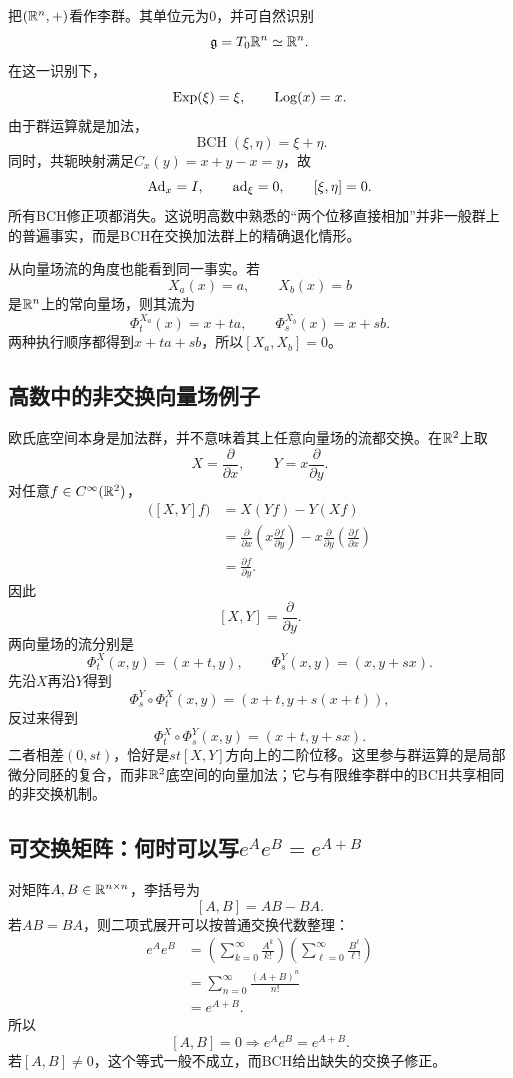 把$(\mathbb{R}^n,+)$看作李群。其单位元为$0$，并可自然识别
\[
    \mathfrak g=T_0\mathbb{R}^n\simeq\mathbb{R}^n.
\]
在这一识别下，
\[
    \operatorname{Exp}(\xi)=\xi,
    \qquad
    \operatorname{Log}(x)=x.
\]
由于群运算就是加法，
\[
    \boxed{
    \operatorname{BCH}(\xi,\eta)
    =\xi+\eta.
    }
\]
同时，共轭映射满足$C_x(y)=x+y-x=y$，故
\[
    \operatorname{Ad}_x=I,
    \qquad
    \operatorname{ad}_\xi=0,
    \qquad
    [\xi,\eta]=0.
\]
所有BCH修正项都消失。这说明高数中熟悉的“两个位移直接相加”并非一般群上的普遍事实，而是BCH在交换加法群上的精确退化情形。

从向量场流的角度也能看到同一事实。若
\[
    X_a(x)=a,
    \qquad
    X_b(x)=b
\]
是$\mathbb{R}^n$上的常向量场，则其流为
\[
    \Phi_t^{X_a}(x)=x+ta,
    \qquad
    \Phi_s^{X_b}(x)=x+sb.
\]
两种执行顺序都得到$x+ta+sb$，所以$[X_a,X_b]=0$。

\subsection{高数中的非交换向量场例子}

欧氏底空间本身是加法群，并不意味着其上任意向量场的流都交换。在$\mathbb{R}^2$上取
\[
    X=\frac{\partial}{\partial x},
    \qquad
    Y=x\frac{\partial}{\partial y}.
\]
对任意$f\in C^\infty(\mathbb{R}^2)$，
\[
\begin{aligned}
    \bigl([X,Y]f\bigr)
    &=X(Yf)-Y(Xf)\\
    &=\frac{\partial}{\partial x}
      \left(x\frac{\partial f}{\partial y}\right)
      -x\frac{\partial}{\partial y}
      \left(\frac{\partial f}{\partial x}\right)\\
    &=\frac{\partial f}{\partial y}.
\end{aligned}
\]
因此
\[
    \boxed{
    [X,Y]=\frac{\partial}{\partial y}.
    }
\]
两向量场的流分别是
\[
    \Phi_t^X(x,y)=(x+t,y),
    \qquad
    \Phi_s^Y(x,y)=(x,y+sx).
\]
先沿$X$再沿$Y$得到
\[
    \Phi_s^Y\circ\Phi_t^X(x,y)
    =(x+t,y+s(x+t)),
\]
反过来得到
\[
    \Phi_t^X\circ\Phi_s^Y(x,y)
    =(x+t,y+sx).
\]
二者相差$(0,st)$，恰好是$st[X,Y]$方向上的二阶位移。这里参与群运算的是局部微分同胚的复合，而非$\mathbb{R}^2$底空间的向量加法；它与有限维李群中的BCH共享相同的非交换机制。

\subsection{可交换矩阵：何时可以写$e^Ae^B=e^{A+B}$}

对矩阵$A,B\in\mathbb{R}^{n\times n}$，李括号为
\[
    [A,B]=AB-BA.
\]
若$AB=BA$，则二项式展开可以按普通交换代数整理：
\[
\begin{aligned}
    e^Ae^B
    &=\left(\sum_{k=0}^\infty\frac{A^k}{k!}\right)
      \left(\sum_{\ell=0}^\infty\frac{B^\ell}{\ell!}\right)\\
    &=\sum_{n=0}^\infty\frac{(A+B)^n}{n!}\\
    &=e^{A+B}.
\end{aligned}
\]
所以
\[
    \boxed{
    [A,B]=0
    \Longrightarrow
    e^Ae^B=e^{A+B}.
    }
\]
若$[A,B]\neq0$，这个等式一般不成立，而BCH给出缺失的交换子修正。

